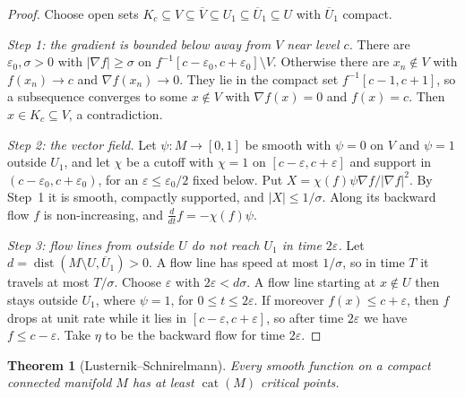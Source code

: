 \documentclass[11pt,openany]{book}
\theoremstyle{plain}
\newtheorem{theorem}{Theorem}[chapter]
\theoremstyle{definition}
\theoremstyle{remark}
\newcommand{\dist}{\operatorname{dist}}
\newcommand{\abs}[1]{\left\lvert #1 \right\rvert}
\begin{document}
\begin{proof}
Choose open sets $K_c\subseteq V\subseteq\overline V\subseteq U_1\subseteq\overline U_1\subseteq U$ with
$\overline U_1$ compact.

\emph{Step 1: the gradient is bounded below away from $V$ near level $c$.} There are $\varepsilon_0,\sigma>0$
with $\abs{\nabla f}\ge\sigma$ on $f^{-1}[c-\varepsilon_0,c+\varepsilon_0]\setminus V$. Otherwise there are
$x_n\notin V$ with $f(x_n)\to c$ and $\nabla f(x_n)\to0$. They lie in the compact set
$f^{-1}[c-1,c+1]$, so a subsequence converges to some $x\notin V$ with $\nabla f(x)=0$ and $f(x)=c$. Then
$x\in K_c\subseteq V$, a contradiction.

\emph{Step 2: the vector field.} Let $\psi\colon M\to[0,1]$ be smooth with $\psi=0$ on $V$ and $\psi=1$
outside $U_1$, and let $\chi$ be a cutoff with $\chi=1$ on $[c-\varepsilon,c+\varepsilon]$ and support in
$(c-\varepsilon_0,c+\varepsilon_0)$, for an $\varepsilon\le\varepsilon_0/2$ fixed below. Put
$X=\chi(f)\psi\nabla f/\abs{\nabla f}^2$. By Step~1 it is smooth, compactly supported, and
$\abs X\le1/\sigma$. Along its backward flow $f$ is non-increasing, and
$\frac{d}{dt}f=-\chi(f)\psi$.

\emph{Step 3: flow lines from outside $U$ do not reach $U_1$ in time $2\varepsilon$.} Let
$d=\dist(M\setminus U,\overline U_1)>0$. A flow line has speed at most $1/\sigma$, so in time $T$ it travels
at most $T/\sigma$. Choose $\varepsilon$ with $2\varepsilon<d\sigma$. A flow line starting at
$x\notin U$ then stays outside $U_1$, where $\psi=1$, for $0\le t\le2\varepsilon$. If moreover $f(x)\le
c+\varepsilon$, then $f$ drops at unit rate while it lies in $[c-\varepsilon,c+\varepsilon]$, so after time
$2\varepsilon$ we have $f\le c-\varepsilon$. Take $\eta$ to be the backward flow for time $2\varepsilon$.
\end{proof}

\begin{theorem}[Lusternik--Schnirelmann]\label{TOP:thm:LS}
Every smooth function on a compact connected manifold $M$ has at least $\operatorname{cat}(M)$ critical
points.
\end{theorem}
\end{document}

